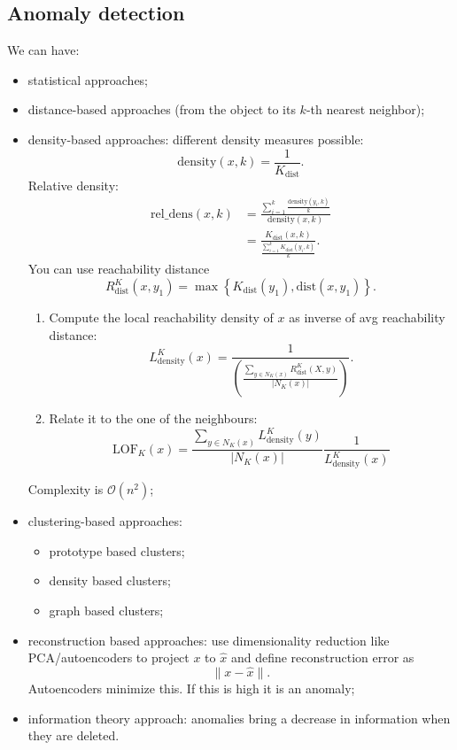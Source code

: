 \documentclass[a4paper,9pt]{extarticle}
\begin{document}
\begin{multicols*}{2}
\section{Anomaly detection}
We can have:
\begin{itemize}
	\item statistical approaches;
	\item distance-based approaches (from the object to its $k$-th nearest neighbor);
	\item density-based approaches: different density measures possible:
	\begin{equation*}
		\mathrm{density}(x,k)=\frac{1}{K_{\mathrm{dist}}}.
	\end{equation*} Relative density:
	\begin{align*}
		\mathrm{rel\_dens}(x,k)&=\frac{\sum_{i=1}^{k}\frac{\mathrm{density}(y_{i},k)}{k}}{\mathrm{density}(x,k)}\\
		&=\frac{K_{\mathrm{dist}}(x,k)}{\frac{\sum_{i=1}^{k}K_{\mathrm{dist}}(y_{i},k)}{k}}.
	\end{align*}
	You can use reachability distance
	\begin{equation*}
		R^{K}_{\mathrm{dist}}(x,y_{1})=\max\left\{K_{\mathrm{dist}}(y_{1}),\mathrm{dist}(x,y_{1})\right\}.
	\end{equation*}
	\begin{riquadro}
		\begin{enumerate}
			\item Compute the local reachability density of $x$ as inverse of avg reachability distance:
			\begin{equation*}
				L^{K}_{\mathrm{density}}(x)=\frac{1}{\left(\frac{\sum_{y\in N_{K}(x)}R^{K}_{\mathrm{dist}}(X,y)}{|N_{K}(x)|}\right)}.
			\end{equation*}
			\item Relate it to the one of the neighbours:
			\begin{equation*}
				\mathrm{LOF}_{K}(x)=\frac{\sum_{y\in N_{K}(x)}L^{K}_{\mathrm{density}}(y)}{|N_{K}(x)|}\frac{1}{L^{K}_{\mathrm{density}}(x)}
			\end{equation*}
		\end{enumerate}
	\end{riquadro}
	Complexity is $\mathcal{O}(n^{2})$;
	\item clustering-based approaches:
	\begin{itemize}
		\item prototype based clusters;
		\item density based clusters;
		\item graph based clusters;
	\end{itemize}
	\item reconstruction based approaches: use dimensionality reduction like PCA/autoencoders to project $x$ to $\hat{x}$ and define reconstruction error as
	\begin{equation*}
		\lVert x-\hat{x}\rVert.
	\end{equation*}
	Autoencoders minimize this. If this is high it is an anomaly;
	\item information theory approach: anomalies bring a decrease in information when they are deleted.
\end{itemize}

\end{multicols*}
\end{document}
